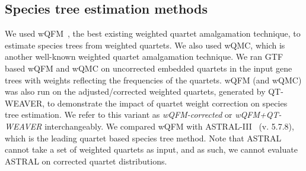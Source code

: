 \documentclass[runningheads]{llncs}
\newcommand{\addb}[1]{{\color{red} #1}}
\begin{document}


\subsection{Species tree estimation methods}
\vspace{-3pt}
We used wQFM~\cite{wqfm}, the best existing weighted quartet amalgamation technique, to estimate species trees from weighted quartets. We also used wQMC, which is another well-known weighted quartet amalgamation technique. %
We ran GTF based wQFM and wQMC on uncorrected embedded quartets in the input gene trees with weights reflecting the frequencies of the quartets. %
wQFM (and wQMC) was also run on the adjusted/corrected weighted quartets, generated by QT-WEAVER, to demonstrate the impact of quartet weight correction on species tree estimation. We refer to this variant as \textit{wQFM-corrected} or \textit{wQFM+QT-WEAVER} interchangeably. We compared wQFM with ASTRAL-III~\cite{astral,zhang2018astral} (v. 5.7.8), which is the leading quartet based species tree method. Note that ASTRAL cannot take a set of weighted quartets as input, and as such, we cannot evaluate ASTRAL on corrected quartet distributions.



 
\end{document}
